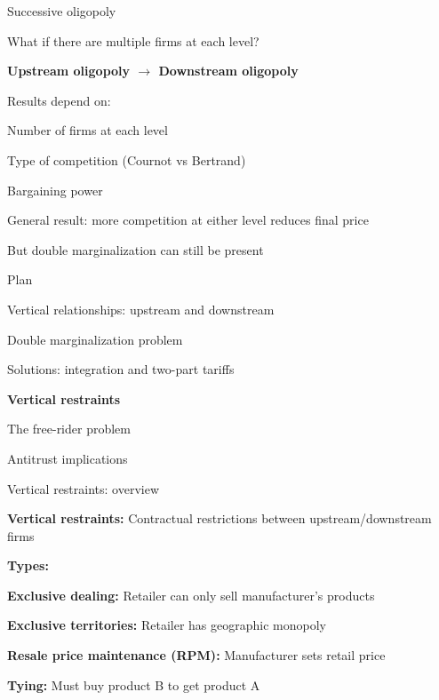 \documentclass[notes,11pt, aspectratio=169]{beamer}
\newenvironment{wideitemize}{\itemize\addtolength{\itemsep}{10pt}}{\enditemize}
\newenvironment{wideenumerate}{\enumerate\addtolength{\itemsep}{10pt}}{\endenumerate}
\begin{document}
\begin{frame}{Successive oligopoly}
	\begin{wideitemize}
		\item What if there are multiple firms at each level?
		\item \textbf{Upstream oligopoly $\rightarrow$ Downstream oligopoly}
		\item Results depend on:
		\begin{wideitemize}
			\vspace{5pt}
			\item Number of firms at each level
			\item Type of competition (Cournot vs Bertrand)
			\item Bargaining power
		\end{wideitemize}
		\item General result: more competition at either level reduces final price
		\item But double marginalization can still be present
	\end{wideitemize}
\end{frame}


\begin{frame}{Plan}
  \begin{wideenumerate}
    \item Vertical relationships: upstream and downstream
    \item Double marginalization problem
    \item Solutions: integration and two-part tariffs
    \item \textbf{Vertical restraints}
    \item The free-rider problem
    \item Antitrust implications
  \end{wideenumerate}
\end{frame}

\begin{frame}{Vertical restraints: overview}
	\begin{wideitemize}
		\item \textbf{Vertical restraints:} Contractual restrictions between upstream/downstream firms
		\item \textbf{Types:}
		\begin{wideenumerate}
			\vspace{5pt}
			\item \textbf{Exclusive dealing:} Retailer can only sell manufacturer's products
			\item \textbf{Exclusive territories:} Retailer has geographic monopoly
			\item \textbf{Resale price maintenance (RPM):} Manufacturer sets retail price
			\item \textbf{Tying:} Must buy product B to get product A
		\end{wideenumerate}
	\end{wideitemize}
\end{frame}
\end{document}
